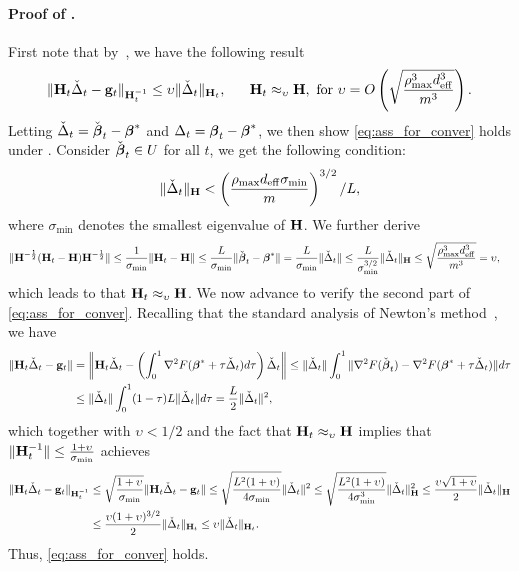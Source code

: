 \documentclass[11pt,a4paper]{article}
\begin{document}
\paragraph{Proof of .}
First note that by~, we have the following result
\begin{align}\label{eq:ass_for_conver}
    \|\mathbf{H}_t\check{\Delta}_{t}-\mathbf{g}_t\|_{\mathbf{H}_t^{-1}}\leq \upsilon \|\check{\Delta}_{t}\|_{\mathbf{H}_t},~~~~~\mathbf{H}_t\approx_{\upsilon}\mathbf{H},~\mathrm{for}~\upsilon=O\left(\sqrt{\frac{\rho_{\max}^3 d^3_{\mathrm{eff}}}{m^3}}\right).
\end{align}
Letting  $\check{\Delta}_{t}=\check{\boldsymbol{\beta}}_t-\boldsymbol{\beta}^{\ast}$ and $\Delta_{t}=\boldsymbol{\beta}_{t}-\boldsymbol{\beta}^{\ast}$, we then show \eqref{eq:ass_for_conver} holds under . 
Consider $\check{\boldsymbol{\beta}}_t\in U$ for all $t$,  
we get the following condition:
\begin{align}
   \|\check{\Delta}_{t}\|_{\mathbf{H}} < \left(\frac{\rho_{\max} d_{\mathrm{eff}}\sigma_{\min}}{m}\right)^{3/2}/L\nonumber,
\end{align}
where $\sigma_{\min}$ denotes the smallest eigenvalue of $\mathbf{H}$. 
We further derive
\begin{align}
\|\mathbf{H}^{-\frac{1}{2}}(\mathbf{H}_t-\mathbf{H})\mathbf{H}^{-\frac{1}{2}}\|&\leq\frac{1}{\sigma_{\min}}\|\mathbf{H}_t-\mathbf{H}\|\leq\frac{L}{\sigma_{\min}}\|\check{\boldsymbol{\beta}}_t-\boldsymbol{\beta}^{\ast}\|= \frac{L}{\sigma_{\min}}\|\check{\Delta}_{t}\|\leq \frac{L}{\sigma^{3/2}_{\min}}\|\check{\Delta}_{t}\|_{\mathbf{H}}\leq \sqrt{\frac{\rho_{\max}^3d^3_{\mathrm{eff}}} {m^3}}=\upsilon,\nonumber
\end{align}
which leads to that $\mathbf{H}_t\approx_\upsilon\mathbf{H}$.  
We now advance to verify the second part of \eqref{eq:ass_for_conver}. 
Recalling that the standard analysis of Newton's method~\citep{boyd2004convex}, we have
\begin{align}
\|\mathbf{H}_t\check{\Delta}_{t}-\mathbf{g}_t\|
& = \left\|\mathbf{H}_t\check{\Delta}_{t}-\left(\int^1_0\nabla^2F(\boldsymbol{\beta}^{\ast}+\tau\check{\Delta}_{t})d\tau\right)\check{\Delta}_{t}\right\|\leq\|\check{\Delta}_{t}\|\int^1_0\|\nabla^2F(\check{\boldsymbol{\beta}}_t)-\nabla^2F(\boldsymbol{\beta}^{\ast}+\tau\check{\Delta}_{t})\|d\tau\nonumber\\
&\leq\|\check{\Delta}_{t}\|\int^1_0(1-\tau)L\|\check{\Delta}_{t}\|d\tau=\frac{L}{2}\|\check{\Delta}_{t}\|^2,\nonumber
\end{align}
which together with $\upsilon< 1/2$  and the fact that  $\mathbf{H}_t\approx_\upsilon\mathbf{H}$ implies that $\|\mathbf{H}_t^{-1}\|\leq \frac{1+\upsilon}{\sigma_{\min}}$  achieves 
\begin{align}
\|\mathbf{H}_t\check{\Delta}_{t}-\mathbf{g}_t\|_{\mathbf{H}_t^{-1}} & \leq \sqrt{\frac{1+\upsilon}{\sigma_{\min}}}\|\mathbf{H}_t\check{\Delta}_{t}-\mathbf{g}_t\|\leq \sqrt{\frac{L^2(1+\upsilon)}{4\sigma_{\min}}}\|\check{\Delta}_{t}\|^2\leq\sqrt{\frac{L^2(1+\upsilon)}{4\sigma^3_{\min}}}\|\check{\Delta}_{t}\|^2_{\mathbf{H}}\leq\frac{\upsilon\sqrt{1+\upsilon}}{2} \|\check{\Delta}_{t}\|_{\mathbf{H}} \nonumber\\
&\leq \frac{\upsilon(1+\upsilon)^{3/2}}{2}\|\check{\Delta}_{t}\|_{\mathbf{H}_t} \leq \upsilon\|\check{\Delta}_{t}\|_{\mathbf{H}_t}. \nonumber
\end{align}
Thus, \eqref{eq:ass_for_conver} holds.
\end{document}
